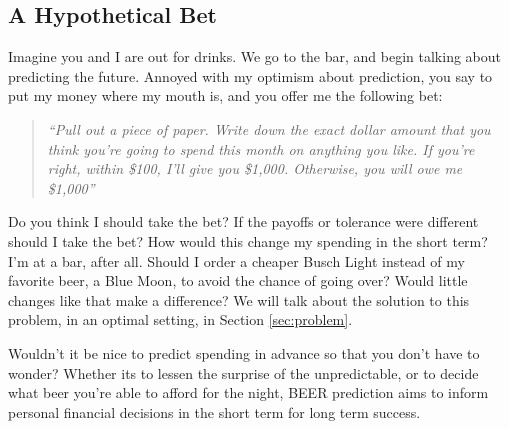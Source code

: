 \documentclass[11pt,a4paper]{article}
\begin{document}
\subsection{A Hypothetical Bet}

Imagine you and I are out for drinks. We go to the bar, and begin talking about predicting the future.  Annoyed with my optimism about prediction, you say to put my money where my mouth is, and you offer me the following bet:

\begin{quote}
	\it \color{harvardcrimson}
	``Pull out a piece of paper. Write down the exact dollar amount that you think you’re going to spend this month on anything you like. If you’re right, within \$100, I’ll give you \$1,000. Otherwise, you will owe me \$1,000'' 
\end{quote} 

Do you think I should take the bet? If the payoffs or tolerance were different should I take the bet? How would this change my spending in the short term? I’m at a bar, after all. Should I order a cheaper Busch Light instead of my favorite beer, a Blue Moon, to avoid the chance of going over? Would little changes like that make a difference? We will talk about the solution to this problem, in an optimal setting, in Section \ref{sec:problem}.

Wouldn’t it be nice to predict spending in advance so that you don’t have to wonder? Whether its to lessen the surprise of the unpredictable, or to decide what beer you’re able to afford for the night, BEER prediction aims to inform personal financial decisions in the short term for long term success. 



\end{document}
